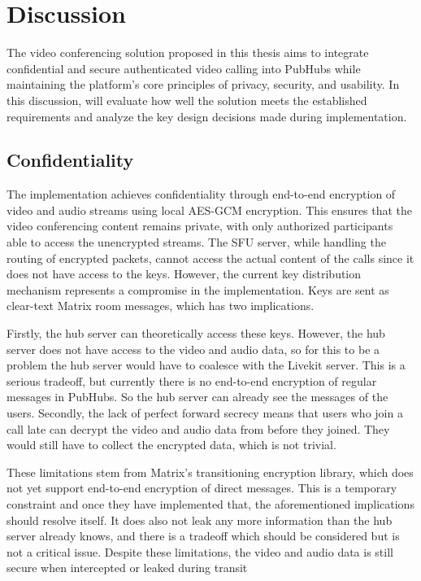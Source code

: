 \documentclass{report}
\begin{document}

\chapter{Discussion}
The video conferencing solution proposed in this thesis aims to integrate confidential and secure authenticated video
calling into PubHubs while maintaining the platform's core principles of privacy, security, and usability. In this
discussion, will
evaluate how well the solution meets the established requirements and analyze the key design decisions made during
implementation.

\section{Confidentiality}
The implementation achieves confidentiality through end-to-end encryption of video and audio streams using local
AES-GCM encryption. This ensures that the video conferencing content remains private, with only authorized
participants able to access the unencrypted streams. The SFU server, while handling the routing of encrypted
packets, cannot access the actual content of the calls since it does not have access to the keys. However, the current
key distribution mechanism represents a compromise in the implementation. Keys are sent as
clear-text Matrix room messages, which has two implications.

Firstly, the hub server can theoretically access these
keys. However, the hub server does not have access to the video and audio data, so for this to be a problem the hub
server would have to coalesce with the Livekit server. This is a serious tradeoff, but currently there is no end-to-end
encryption of regular messages in PubHubs. So the hub server can already see the messages of the users. Secondly,
the lack of perfect forward secrecy means that users who join a call late can decrypt the video and audio data from
before they joined. They would still have to collect the encrypted data, which is not trivial.

These limitations stem from Matrix's transitioning encryption library, which does not yet support end-to-end
encryption of direct messages. This is a temporary constraint and once they have implemented that, the
aforementioned implications should resolve itself. It does also not leak any more information than the hub server
already knows, and there is a tradeoff which should be considered but is not a critical issue. Despite these limitations,
the video and audio data is still secure when intercepted or leaked during transit
\end{document}
